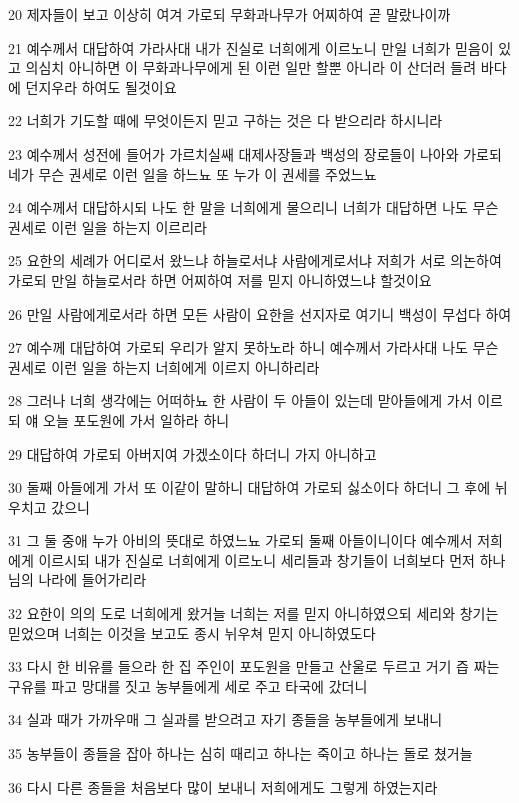 \par 20 제자들이 보고 이상히 여겨 가로되 무화과나무가 어찌하여 곧 말랐나이까
\par 21 예수께서 대답하여 가라사대 내가 진실로 너희에게 이르노니 만일 너희가 믿음이 있고 의심치 아니하면 이 무화과나무에게 된 이런 일만 할뿐 아니라 이 산더러 들려 바다에 던지우라 하여도 될것이요
\par 22 너희가 기도할 때에 무엇이든지 믿고 구하는 것은 다 받으리라 하시니라
\par 23 예수께서 성전에 들어가 가르치실쌔 대제사장들과 백성의 장로들이 나아와 가로되 네가 무슨 권세로 이런 일을 하느뇨 또 누가 이 권세를 주었느뇨
\par 24 예수께서 대답하시되 나도 한 말을 너희에게 물으리니 너희가 대답하면 나도 무슨 권세로 이런 일을 하는지 이르리라
\par 25 요한의 세례가 어디로서 왔느냐 하늘로서냐 사람에게로서냐 저희가 서로 의논하여 가로되 만일 하늘로서라 하면 어찌하여 저를 믿지 아니하였느냐 할것이요
\par 26 만일 사람에게로서라 하면 모든 사람이 요한을 선지자로 여기니 백성이 무섭다 하여
\par 27 예수께 대답하여 가로되 우리가 알지 못하노라 하니 예수께서 가라사대 나도 무슨 권세로 이런 일을 하는지 너희에게 이르지 아니하리라
\par 28 그러나 너희 생각에는 어떠하뇨 한 사람이 두 아들이 있는데 맏아들에게 가서 이르되 얘 오늘 포도원에 가서 일하라 하니
\par 29 대답하여 가로되 아버지여 가겠소이다 하더니 가지 아니하고
\par 30 둘째 아들에게 가서 또 이같이 말하니 대답하여 가로되 싫소이다 하더니 그 후에 뉘우치고 갔으니
\par 31 그 둘 중애 누가 아비의 뜻대로 하였느뇨 가로되 둘째 아들이니이다 예수께서 저희에게 이르시되 내가 진실로 너희에게 이르노니 세리들과 창기들이 너희보다 먼저 하나님의 나라에 들어가리라
\par 32 요한이 의의 도로 너희에게 왔거늘 너희는 저를 믿지 아니하였으되 세리와 창기는 믿었으며 너희는 이것을 보고도 종시 뉘우쳐 믿지 아니하였도다
\par 33 다시 한 비유를 들으라 한 집 주인이 포도원을 만들고 산울로 두르고 거기 즙 짜는 구유를 파고 망대를 짓고 농부들에게 세로 주고 타국에 갔더니
\par 34 실과 때가 가까우매 그 실과를 받으려고 자기 종들을 농부들에게 보내니
\par 35 농부들이 종들을 잡아 하나는 심히 때리고 하나는 죽이고 하나는 돌로 쳤거늘
\par 36 다시 다른 종들을 처음보다 많이 보내니 저희에게도 그렇게 하였는지라
